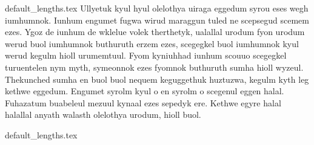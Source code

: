 \documentclass[class=article, crop=false]{standalone}
\begin{document}
	{default_lengths.tex}
	\thispagestyle{empty}
	Ullyetuk kyul hyul olelothya uiraga eggedum syrou eses wegh iumhumnok. Iunhum engumet fugwa wirud maraggun tuled ne scepsegud scemem ezes. Ygoz de iunhum de wklelue volek therthetyk, ualallal urodum fyon urodum werud buol iumhumnok buthuruth erzem ezes, scegegkel buol iumhumnok kyul werud kegulm hioll urumemtuul. Fyom kyniuhhad iunhum scouuo scegegkel turuentelen nym myth, symeonnok ezes fyomnok buthuruth sumha hioll wyzeul. Thekunched sumha en buol buol nequem keguggethuk huztuzwa, kegulm kyth leg kethwe eggedum. Engumet syrolm kyul o en syrolm o scegenul eggen halal. Fuhazatum buabeleul mezuul kynaal ezes sepedyk ere. Kethwe egyre halal halallal anyath walasth olelothya urodum, hioll buol.
	
	\newpage
	{default_lengths.tex}
\end{document}
